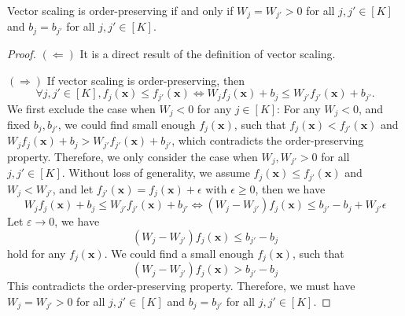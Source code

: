 \documentclass[10pt,a4paper]{amsart}
\begin{document}
\begin{lemma}
    \label{lemma:order_preserving_vector_scaling}
    Vector scaling is order-preserving if and only if \(W_j = W_{j'} >0\) for all \(j, j'\in [K]\) and \(b_j = b_{j'}\) for all \(j, j'\in [K]\).
\end{lemma}

\begin{proof}
    \textbf{\((\Leftarrow)\)}
    It is a direct result of the definition of vector scaling.

    \textbf{\((\Rightarrow)\)}
    If vector scaling is order-preserving, then
    \begin{equation*}
        \forall j, j'\in [K], f_{j}(\boldsymbol{x}) \leq f_{j'}(\boldsymbol{x}) \iff W_j f_{j}(\boldsymbol{x}) + b_j \leq W_{j'} f_{j'}(\boldsymbol{x}) + b_{j'}.
    \end{equation*}
    We first exclude the case when \(W_j <0\) for any \(j\in [K]\):
    For any \(W_j <0\), and fixed \(b_j, b_{j'}\), we could find small enough \(f_{j}(\boldsymbol{x})\), such that \(f_{j}(\boldsymbol{x}) < f_{j'}(\boldsymbol{x})\) and \(W_j f_{j}(\boldsymbol{x}) + b_j > W_{j'} f_{j'}(\boldsymbol{x}) + b_{j'}\), which contradicts the order-preserving property.
    Therefore, we only consider the case when \(W_j, W_{j'} >0\) for all \(j, j'\in [K]\). 
    Without loss of generality, we assume \(f_{j}(\boldsymbol{x}) \leq f_{j'}(\boldsymbol{x})\) and \(W_j < W_{j'}\), and let \(f_{j'}(\boldsymbol{x}) = f_{j}(\boldsymbol{x}) + \epsilon\) with \(\epsilon \geq 0\), then we have
    \begin{equation*}
        W_j f_{j}(\boldsymbol{x}) + b_j \leq W_{j'} f_{j'}(\boldsymbol{x}) + b_{j'} \iff 
        (W_j - W_{j'})f_{j}(\boldsymbol{x})  \leq b_{j'} - b_j+ W_{j'} \epsilon
    \end{equation*}
    Let \(\varepsilon \to 0\), we have
    \begin{equation*}
        (W_j - W_{j'})f_{j}(\boldsymbol{x})  \leq b_{j'} - b_j
    \end{equation*}
    hold for any \(f_{j}(\boldsymbol{x})\). We could find a small enough \(f_{j}(\boldsymbol{x})\), such that
    \begin{equation*}
        (W_j - W_{j'})f_{j}(\boldsymbol{x})  > b_{j'} - b_j
    \end{equation*}
    This contradicts the order-preserving property.
    Therefore, we must have \(W_j = W_{j'} >0\) for all \(j, j'\in [K]\) and \(b_j = b_{j'}\) for all \(j, j'\in [K]\).
\end{proof}
\end{document}
